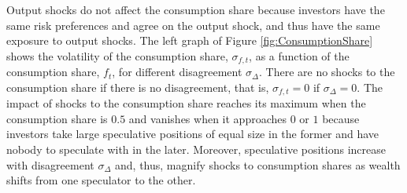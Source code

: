 \documentclass[preprint,11pt,authoryear]{elsarticle}
\theoremstyle{plain}
\begin{document}
Output shocks do not affect the consumption share because investors have the same risk preferences and agree on the output shock, and thus have the same exposure to output shocks.  The left graph of Figure \ref{fig:ConsumptionShare} shows the volatility of the consumption share, $\sigma_{f,t}$, as a function of the consumption share, $f_t$, for different disagreement $\sigma_{\Delta}$.  There are no shocks to the consumption share if there is no disagreement, that is, $\sigma_{f,t}=0$ if $\sigma_{\Delta}=0$. The impact of shocks to the consumption share reaches its maximum when the consumption share is $0.5$ and vanishes when it approaches $0$ or $1$ because investors take large speculative positions of equal size in the former and have nobody to speculate with in the later. Moreover, speculative positions increase with disagreement $\sigma_{\Delta}$ and, thus, magnify shocks to consumption shares as wealth shifts from one speculator to the other.   
\end{document}
